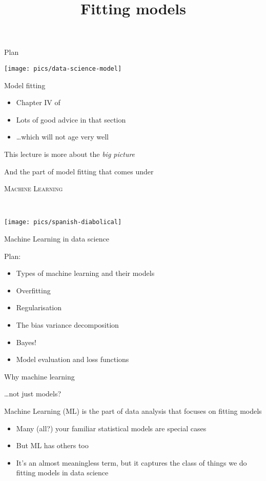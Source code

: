 \documentclass{hertieteaching}
\title{Fitting models}
\begin{document}
\maketitle

\begin{frame}{Plan}

\centerline{\texttt{[image: pics/data-science-model]}}

\pause

Model fitting 
\begin{itemize}
  \item Chapter IV of \textcite{Wickham.Grolemund2016}
  \item Lots of good advice in that section
  \item \ldots which will not age very well
\end{itemize}

\pause 

This lecture is more about the \textit{big picture}

And the part of model fitting that comes under

\pause

\bigskip
\centerline{\textsc{Machine Learning}}
\end{frame}

\begin{frame}{~}
  
\centerline{\texttt{[image: pics/spanish-diabolical]}} 

\end{frame}



\begin{frame}{Machine Learning in data science}
  
Plan:
 \begin{itemize}
  \item Types of machine learning and their models
  \item Overfitting
  \item Regularisation
  \item The bias variance decomposition
  \item Bayes!
  \item Model evaluation and loss functions
\end{itemize}
 
\end{frame}

\begin{frame}{Why machine learning}

\ldots not just models?

Machine Learning (ML) is the part of data analysis that 
focuses on fitting models
\begin{itemize}
  \item Many (all?) your familiar statistical models are special cases
  \item But ML has others too
  \item It's an almost meaningless term, but it captures the class of things we do fitting models in data science
\end{itemize}
  
\end{frame}
\end{document}
